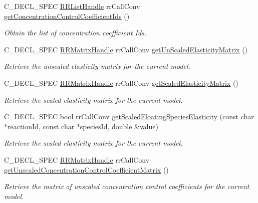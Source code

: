 \begin{DoxyCompactItemize}
\-C\-\_\-\-D\-E\-C\-L\-\_\-\-S\-P\-E\-C \hyperlink{rr__c__types_8h_a840005f5261fec71eec85cc770317c5d}{\-R\-R\-List\-Handle} rr\-Call\-Conv \hyperlink{group__mca_gaa65722f7525d288a8aaa3a98e33594b6}{get\-Concentration\-Control\-Coefficient\-Ids} ()
\begin{DoxyCompactList}\small\item\em \-Obtain the list of concentration coefficient \-Ids. \end{DoxyCompactList}\item 
\-C\-\_\-\-D\-E\-C\-L\-\_\-\-S\-P\-E\-C \hyperlink{rr__c__types_8h_a87174eefa58ae98dec58c9253ae6c5da}{\-R\-R\-Matrix\-Handle} \*
rr\-Call\-Conv \hyperlink{group__mca_ga82cf39ff64eb0446c9f5a2e772283323}{get\-Un\-Scaled\-Elasticity\-Matrix} ()
\begin{DoxyCompactList}\small\item\em \-Retrieve the unscaled elasticity matrix for the current model. \end{DoxyCompactList}\item 
\-C\-\_\-\-D\-E\-C\-L\-\_\-\-S\-P\-E\-C \hyperlink{rr__c__types_8h_a87174eefa58ae98dec58c9253ae6c5da}{\-R\-R\-Matrix\-Handle} \*
rr\-Call\-Conv \hyperlink{group__mca_gaf8431784ec5c2ce1d0416606056f3d44}{get\-Scaled\-Elasticity\-Matrix} ()
\begin{DoxyCompactList}\small\item\em \-Retrieve the scaled elasticity matrix for the current model. \end{DoxyCompactList}\item 
\-C\-\_\-\-D\-E\-C\-L\-\_\-\-S\-P\-E\-C bool rr\-Call\-Conv \hyperlink{group__mca_ga3510a64d86e24d36df049fce06f3a138}{get\-Scaled\-Floating\-Species\-Elasticity} (const char $\ast$reaction\-Id, const char $\ast$species\-Id, double \&value)
\begin{DoxyCompactList}\small\item\em \-Retrieve the scaled elasticity matrix for the current model. \end{DoxyCompactList}\item 
\-C\-\_\-\-D\-E\-C\-L\-\_\-\-S\-P\-E\-C \hyperlink{rr__c__types_8h_a87174eefa58ae98dec58c9253ae6c5da}{\-R\-R\-Matrix\-Handle} \*
rr\-Call\-Conv \hyperlink{group__mca_ga418c0108d37bc4f35a55291ca85e0a3f}{get\-Unscaled\-Concentration\-Control\-Coefficient\-Matrix} ()
\begin{DoxyCompactList}\small\item\em \-Retrieve the matrix of unscaled concentration control coefficients for the current model. \end{DoxyCompactList}\item 

\end{DoxyCompactItemize}
